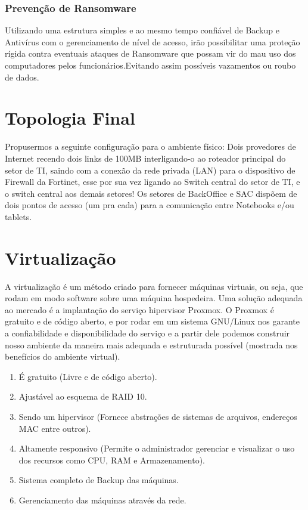 \documentclass[12pt]{article}
\begin{document}
\subsubsection{Prevenção de Ransomware}
Utilizando uma estrutura simples e ao mesmo tempo confiável de Backup e Antivírus com o gerenciamento de nível de acesso, irão possibilitar uma proteção rígida contra eventuais ataques de Ransomware que possam vir do mau uso dos computadores pelos funcionários.Evitando assim possíveis vazamentos ou roubo de dados.

\section{Topologia Final}
Propusermos a seguinte configuração para o ambiente físico: Dois provedores de Internet recendo dois links de 100MB interligando-o ao roteador principal do setor de TI, saindo com a conexão da rede privada (LAN) para o dispositivo de Firewall da Fortinet, esse por sua vez ligando ao Switch central do setor de TI, e o switch central aos demais setores! Os setores de BackOffice e SAC dispõem de dois pontos de acesso (um pra cada) para a comunicação entre Notebooks e/ou tablets.

\section{Virtualização}
A virtualização é um método criado para fornecer máquinas virtuais, ou seja, que rodam em modo software sobre uma máquina hospedeira. Uma solução adequada ao mercado é a implantação do serviço hipervisor Proxmox. O Proxmox é gratuito e de código aberto, e por rodar em um sistema GNU/Linux nos garante a confiabilidade e disponibilidade do serviço e a partir dele podemos construir nosso ambiente da maneira mais adequada e estruturada possível (mostrada nos benefícios do ambiente virtual).

\begin{enumerate}
    \item É gratuito (Livre e de código aberto).
    \item Ajustável ao esquema de RAID 10.
    \item Sendo um hipervisor (Fornece abstrações de sistemas de arquivos, endereços MAC entre outros).
    \item Altamente responsivo (Permite o administrador gerenciar e visualizar o uso dos recursos como CPU, RAM e Armazenamento).
    \item Sistema completo de Backup das máquinas.
    \item Gerenciamento das máquinas através da rede.
\end{enumerate}
\end{document}
